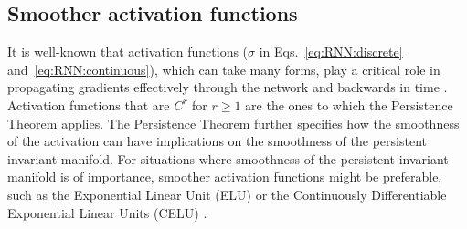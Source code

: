 \documentclass{article} %
\newcounter{ct}
\theoremstyle{definition}
\theoremstyle{remark}
\begin{document}
\subsection{Smoother activation functions}
It is well-known that activation functions (\(\sigma\) in  Eqs.~\ref{eq:RNN:discrete} and~\ref{eq:RNN:continuous}), which can take many forms, play a critical role in propagating gradients effectively through the network and backwards in time \citep{jagtap2023,ramachandran2017,hayou2019}.
Activation functions that are \(C^r\) for \(r\geq 1\) are the ones to which the Persistence Theorem applies.
The Persistence Theorem further specifies how the smoothness of the activation can have implications on the smoothness of the persistent invariant manifold.
For situations where smoothness of the persistent invariant manifold is of importance, smoother activation functions might be preferable, such as the Exponential Linear Unit (ELU)\citep{clevert2015} or the Continuously Differentiable Exponential Linear Units (CELU) \citep{barron2017}.








\end{document}
